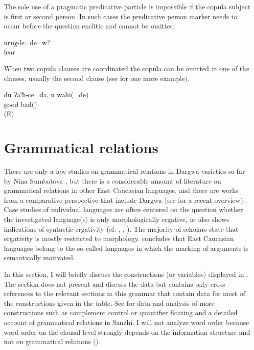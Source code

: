 The sole use of a pragmatic predicative particle is impossible if the copula subject is first or second person. In such cases the predicative person marker needs to occur before the question enclitic and cannot be omitted:
%
\begin{exe}
	\ex	\label{ex:Are you afraid}
	\gll	uruχ-le=de=w?\\
		fear\\
	\glt	{}
\end{exe}

When two copula clauses are coordinated the copula can be omitted in one of the clauses, usually the second clause  (see  for one more example).
%
\begin{exe}
	\ex	\label{ex:‎‎‎I am good, you (are) bad}
	\gll	du	ʡaˁħ-ce=da,	u	wahi(=de)\\
			good		bad()\\
	\glt	{} (E)
\end{exe}




\section{Grammatical relations}
\label{sec:Grammatical relations}

There are only a few studies on grammatical relations in Dargwa varieties so far by Nina Sumbatova \citep{Sumbatova2014, Sumbatova2017}, but there is a considerable amount of literature on grammatical relations in other East Caucasian languages, and there are works from a comparative perspective that include Dargwa (see \citealp{Forker2017} for a recent overview). Case studies of individual languages are often centered on the question whether the investigated language(s) is only morphologically ergative, or also shows indications of syntactic ergativity (cf. \citealp{Nichols1980}, \citealp{Crisp1983}, \citealp{Comrie.etal2011}). The majority of scholars state that ergativity is mostly restricted to morphology. \citet{Kibrik1985, Kibrik1997, Kibrik2003} concludes that East Caucasian languages belong to the so-called  languages \citep[123]{Foley.vanValin1984} in which the marking of arguments is semantically motivated. 

In this section, I will briefly discuss the constructions (or variables) displayed in . The section does not present and discuss the data but contains only cross-references to the relevant sections in this grammar that contain data for most of the constructions given in the table. See \citealp{Forker2019} for data and analysis of more constructions such as complement control or quantifier floating and a detailed account of grammatical relations in Sanzhi. I will not analyze word order because word order on the clausal level strongly depends on the information structure and not on grammatical relations (). 

